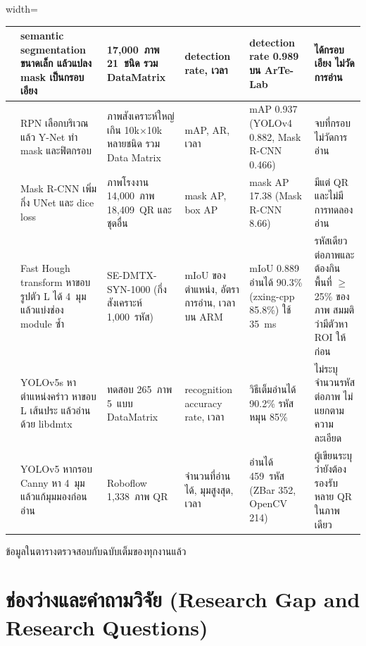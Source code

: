 \documentclass[20pt,a4paper]{article}
\begin{document}
\begin{table}[H]
\begin{adjustbox}{width=\textwidth}
\begin{tabular}{|
>{\centering\arraybackslash}p{1.0cm}|
p{2.5cm}|
p{2.5cm}|
p{2.3cm}|
p{2.5cm}|
p{3.0cm}|}
\cite{zharkov2019universal} &
semantic segmentation ขนาดเล็ก แล้วแปลง mask เป็นกรอบเอียง &
17,000~ภาพ 21~ชนิด รวม DataMatrix &
detection rate, เวลา &
detection rate 0.989 บน ArTe-Lab &
ได้กรอบเอียง ไม่วัดการอ่าน
\\
\hline

\cite{quenum2021uhr} &
RPN เลือกบริเวณ แล้ว Y-Net ทำ mask และฟิตกรอบ &
ภาพสังเคราะห์ใหญ่เกิน 10k$\times$10k หลายชนิด รวม Data Matrix &
mAP, AR, เวลา &
mAP 0.937 (YOLOv4 0.882, Mask R-CNN 0.466) &
จบที่กรอบ ไม่วัดการอ่าน
\\
\hline

\cite{yuan2019murcnn} &
Mask R-CNN เพิ่มกิ่ง UNet และ dice loss &
ภาพโรงงาน 14,000~ภาพ 18,409~QR และชุดอื่น &
mask AP, box AP &
mask AP 17.38 (Mask R-CNN 8.66) &
มีแต่ QR และไม่มีการทดลองอ่าน
\\
\hline

\cite{rybakova2025datamatrix} &
Fast Hough transform หาขอบรูปตัว L ได้ 4~มุม แล้วแบ่งช่อง module ซ้ำ &
SE-DMTX-SYN-1000 (กึ่งสังเคราะห์ 1,000~รหัส) &
mIoU ของตำแหน่ง, อัตราการอ่าน, เวลาบน ARM &
mIoU 0.889 อ่านได้ 90.3\% (zxing-cpp 85.8\%) ใช้ 35~ms &
รหัสเดียวต่อภาพและต้องกินพื้นที่ $\geq$ 25\% ของภาพ สมมติว่ามีตัวหา ROI ให้ก่อน
\\
\hline

\cite{liu2024lshaped} &
YOLOv5s หาตำแหน่งคร่าว หาขอบ L เส้นประ แล้วอ่านด้วย libdmtx &
ทดสอบ 265~ภาพ 5~แบบ DataMatrix &
recognition accuracy rate, เวลา &
วิธีเต็มอ่านได้ 90.2\% รหัสหมุน 85\% &
ไม่ระบุจำนวนรหัสต่อภาพ ไม่แยกตามความละเอียด
\\
\hline

\cite{corpuz2025qr} &
YOLOv5 หากรอบ Canny หา 4~มุม แล้วแก้มุมมองก่อนอ่าน &
Roboflow 1,338~ภาพ QR &
จำนวนที่อ่านได้, มุมสูงสุด, เวลา &
อ่านได้ 459~รหัส (ZBar 352, OpenCV 214) &
ผู้เขียนระบุว่ายังต้องรองรับหลาย QR ในภาพเดียว
\\
\hline

\end{tabular}

\end{adjustbox}
\end{table}

ข้อมูลในตารางตรวจสอบกับฉบับเต็มของทุกงานแล้ว


\section{ช่องว่างและคำถามวิจัย
(Research Gap and Research Questions)}
\end{document}

